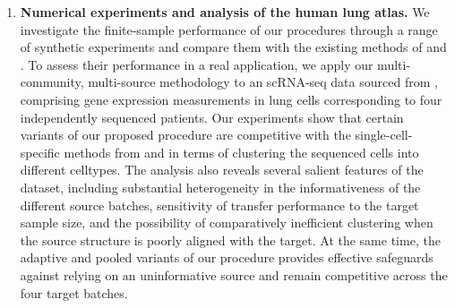 \documentclass[10pt]{article}
\begin{document}
\begin{enumerate}
\item {\bf Numerical experiments and analysis of the human lung atlas.} We investigate the finite-sample performance of our procedures through a range of synthetic experiments and compare them with the existing methods of \citet{tian2025robust} and \citet{wang_zhou}. To assess their performance in a real application, we apply our multi-community, multi-source methodology to an scRNA-seq data sourced from \citet{Vieira_Braga2019-nl}, comprising gene expression measurements in lung cells corresponding to four independently sequenced patients. Our experiments show that certain variants of our proposed procedure are competitive with the single-cell-specific methods from \citet{gdec_paper} and \citet{nmf_paper} in terms of clustering the sequenced cells into different celltypes. The analysis also reveals several salient features of the dataset, including substantial heterogeneity in the informativeness of the different source batches, sensitivity of transfer performance to the target sample size, and the possibility of comparatively inefficient clustering when the source structure is poorly aligned with the target. At the same time, the adaptive and pooled variants of our procedure provides effective safeguards against relying on an uninformative source and remain competitive across the four target batches.
\end{enumerate}
\end{document}
